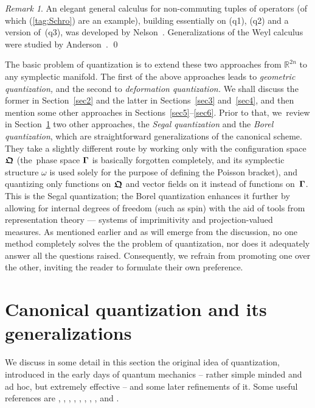 \documentclass[12pt]{amsart}
\numberwithin{equation}{section}
\theoremstyle{remark}
\newtheorem{remark*}{Remark}
\newcommand\Omg{{\bigam}}   %
\newcommand\RR{\mathbb R}
\newcommand{\bigam}{\mbox{\boldmath $\Gamma$}}
\newcommand{\bfrakQ}{\mbox{\boldmath $\mathfrak Q$}}
\begin{document}
\begin{remark*} An elegant general calculus for non-commuting tuples of
operators (of which (\ref{tag:Schro}) are an example), building essentially on
(q1), (q2) and a version of~(q3), was developed by Nelson~\cite{bib:Nels}.
Generalizations of the Weyl calculus were studied by
Anderson~\cite{bib:Anders}. \qed  \end{remark*}


\medskip

The basic problem of quantization is to extend these two approaches from
$\RR^{2n}$ to any symplectic manifold. The first of the above approaches leads
to {\it geometric quantization,\/} and the second to {\it deformation
quantization.\/} We shall discuss the former in Section~\ref{sec2} and  the
latter in Sections~\ref{sec3} and~\ref{sec4}, and then mention some other
approaches in Sections~\ref{sec5}--\ref{sec6}. Prior to that, we~review in
Section~\ref{sec-canquant} two other approaches, the {\it Segal quantization\/}
and the {\it Borel quantization\/}, which are straightforward generalizations
of the canonical scheme. They take a slightly different route by working only
with the configuration space~$\bfrakQ$ (the~phase space $\Omg$ is basically
forgotten completely, and its symplectic structure $\omega$ is used solely for
the purpose of defining the Poisson bracket), and quantizing only functions on
$\bfrakQ$ and vector fields on it instead of functions on~$\Omg$. This is the
Segal quantization; the Borel quantization enhances it further by allowing for
internal degrees of freedom (such as spin) with the aid of tools from
representation theory --- systems of imprimitivity and projection-valued
measures. As mentioned earlier and as will emerge from the discussion,
no one method completely solves the
the problem of quantization, nor does it adequately answer all the questions raised.
Consequently, we refrain from promoting one over the other,
inviting the reader to formulate their own preference.




\section{Canonical quantization and its generalizations}\label{sec-canquant}

We discuss in some detail in this section the original idea of quantization,
introduced in the early days of quantum mechanics  -- rather simple minded and
ad hoc, but extremely effective -- and some later refinements of it. Some
useful references are \cite{bib:-doebtol}, \cite{bib:ET},
\cite{bib:-golmensh1}, \cite{bib:-golmensh2}, \cite{bib:Groe}, \cite{bib:-GS},
\cite{bib:vHove}, \cite{bib:-nattermann}, \cite{bib:Segal} and
\cite{bib:-simsudmu1}.
\end{document}
